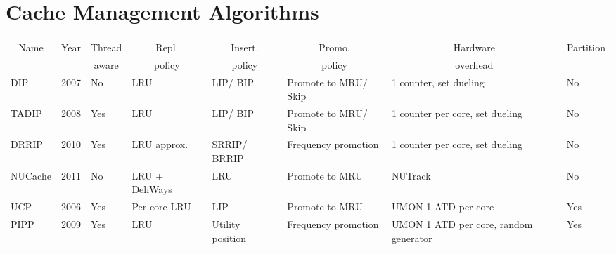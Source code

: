 
\chapter{Cache Management Algorithms}
\label{cpt:algorithms}

\begin{table}[!htb]
\begin{tabular}{|p{1.4cm}|p{0.5cm}|p{0.8cm}|p{1.2cm}|p{1.2cm}|p{1.2cm}|p{1.2cm}|p{1.0cm}|}
\hline
\multicolumn{1}{|c|}{Name} & \multicolumn{1}{c|}{Year} & \multicolumn{1}{c|}{Thread} & \multicolumn{1}{c|}{Repl.} & \multicolumn{1}{c|}{Insert.} & \multicolumn{1}{c|}{Promo.} & \multicolumn{1}{c|}{Hardware}    & \multicolumn{1}{c|}{Partition}     \\
\multicolumn{1}{|c|}{}          & \multicolumn{1}{c|}{}          & \multicolumn{1}{c|}{aware}  & \multicolumn{1}{c|}{policy}      & \multicolumn{1}{c|}{policy}    & \multicolumn{1}{c|}{policy}    & \multicolumn{1}{c|}{overhead\footnotemark}  & \multicolumn{1}{c|}{}       \\ \hline
DIP                             & 2007                           & No                          & LRU                              & LIP/ BIP                        & Promote to MRU/ Skip            & 1 counter, set dueling    & No            \\ \hline
TADIP                           & 2008                          & Yes                         & LRU                              & LIP/ BIP                        & Promote to MRU/ Skip            & 1 counter per core, set dueling  & No          \\ \hline
DRRIP                           & 2010                          & Yes                         & LRU approx.                      & SRRIP/ BRRIP                    & Frequency promotion            & 1 counter per core, set dueling  & No          \\ \hline
NUCache                         & 2011                         & No                          & LRU + DeliWays     & LRU                            & Promote to MRU                 & NUTrack                            & No    \\ \hline
UCP                             & 2006                           & Yes                         & Per core LRU                     & LIP                            & Promote to MRU                 & UMON 1 ATD per core   & Yes                \\ \hline
PIPP                            & 2009                           & Yes                         & LRU                              & Utility position               & Frequency promotion            & UMON 1 ATD per core, random generator & Yes \\ \hline

\end{tabular}
\end{table}
